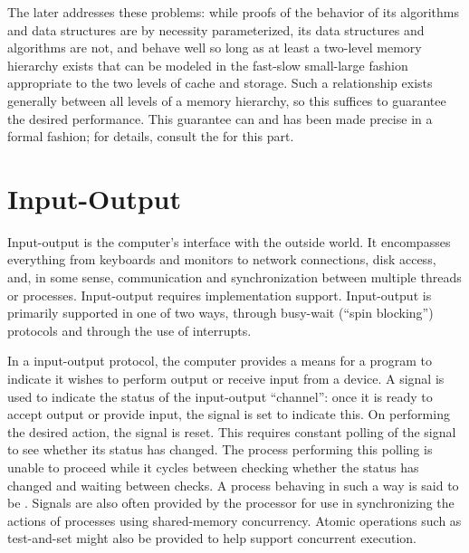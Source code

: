 The later  addresses these problems: while proofs of the behavior of its algorithms and data structures are by necessity parameterized, its data structures and algorithms are not, and behave well so long as at least a two-level memory hierarchy exists that can be modeled in the fast-slow small-large fashion appropriate to the two levels of cache and storage. Such a relationship exists generally between all levels of a memory hierarchy, so this suffices to guarantee the desired performance. This guarantee can and has been made precise in a formal fashion; for details, consult the  for this part.

\section{Input-Output}\label{background:computers:inputoutput}
Input-output is the computer's interface with the outside world. It encompasses everything from keyboards and monitors to network connections, disk access, and, in some sense, communication and synchronization between multiple threads or processes. Input-output requires implementation support. Input-output is primarily supported in one of two ways, through busy-wait (``spin blocking'') protocols and through the use of interrupts.

In a  input-output protocol, the computer provides a means for a program to indicate it wishes to perform output or receive input from a device. A signal is used to indicate the status of the input-output ``channel'': once it is ready to accept output or provide input, the signal is set to indicate this. On performing the desired action, the signal is reset. This requires constant polling of the signal to see whether its status has changed. The process performing this polling is unable to proceed while it cycles between checking whether the status has changed and waiting between checks. A process behaving in such a way is said to be . Signals are also often provided by the processor for use in synchronizing the actions of processes using shared-memory concurrency. Atomic operations such as test-and-set might also be provided to help support concurrent execution.

